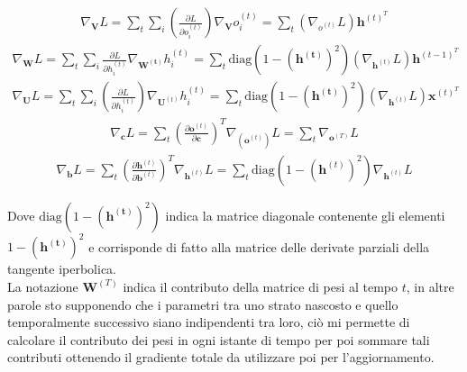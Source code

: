 \documentclass[../../main.tex]{subfiles}
\begin{document}
\begin{fleqn}[1cm]
    \begin{align}
        \nabla_{\boldsymbol{V}}L = \sum_t \sum_i \left(\frac{\partial L}{\partial o_i^{(t)}}\right) \nabla_{\boldsymbol{V}}o_i^{(t)} = \sum_t (\nabla_{o^{(t)}}L) \boldsymbol{h}^{(t)^T}
    \end{align}
    \begin{align}
        \nabla_{\boldsymbol{W}}L = \sum_t \sum_i \frac{\partial L}{\partial h_i^{(t)}} \nabla_{\boldsymbol{W^{(t)}}} h_i^{(t)} = \sum_t \text{diag} \left(1 - (\boldsymbol{h^{(t)}})^2\right) (\nabla_{\boldsymbol{h}^{(t)}}L)\boldsymbol{h}^{(t-1)^T}
    \end{align}
    \begin{align}
        \nabla_{\boldsymbol{U}}L = \sum_t \sum_i \left(\frac{\partial L}{\partial h_i^{(t)}}\right) \nabla_{\boldsymbol{U}^{(t)}}h_i^{(t)} = \sum_t \text{diag} \left(1 - (\boldsymbol{h^{(t)}})^2\right) (\nabla_{\boldsymbol{h}^{(t)}}L )\boldsymbol{x}^{(t)^T}
    \end{align}
    \begin{align}
        \nabla_{\boldsymbol{c}}L = \sum_t \left(\frac{\partial \boldsymbol{o}^{(t)}}{\partial \boldsymbol{c}}\right)^T \nabla_{(\boldsymbol{o}^{(t)})}L = \sum_t \nabla_{\boldsymbol{o}^{(T)}} L
    \end{align}
    \begin{align}
        \nabla_{\boldsymbol{b}}L = \sum_t \left(\frac{\partial \boldsymbol{h}^{(t)}}{\partial \boldsymbol{b}^{(t)}}\right)^T \nabla_{\boldsymbol{h}^{(t)}} L = \sum_t \text{diag}\left(1 - (\boldsymbol{h}^{(t)})^2\right)\nabla_{\boldsymbol{h}^{(t)}}L
    \end{align}
\end{fleqn}
Dove $\text{diag} \left(1 - (\boldsymbol{h^{(t)}})^2\right)$ indica la matrice diagonale contenente gli elementi $1 - (\boldsymbol{h^{(t)}})^2$ e corrisponde di fatto alla matrice delle derivate parziali della tangente iperbolica.\\
La notazione $\boldsymbol{W}^{(T)}$ indica il contributo della matrice di pesi al tempo $t$, in altre parole sto supponendo che i parametri tra uno strato nascosto e quello temporalmente successivo siano indipendenti tra loro, ciò mi permette di calcolare il contributo dei pesi in ogni istante di tempo per poi sommare tali contributi ottenendo il gradiente totale da utilizzare poi per l'aggiornamento.
\end{document}
